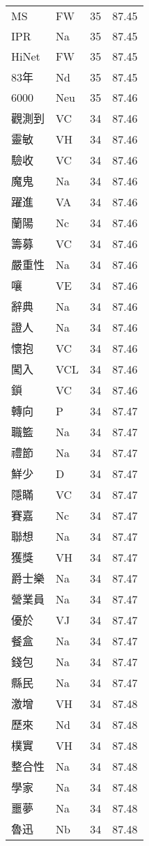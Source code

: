 \documentclass[twocolumn]{book}
\begin{document}
\begin{supertabular}{llrr}
MS & FW & 35 &  87.45\\
IPR & Na & 35 &  87.45\\
HiNet & FW & 35 &  87.45\\
83年 & Nd & 35 &  87.45\\
6000 & Neu & 35 &  87.46\\
觀測到 & VC & 34 &  87.46\\
靈敏 & VH & 34 &  87.46\\
驗收 & VC & 34 &  87.46\\
魔鬼 & Na & 34 &  87.46\\
躍進 & VA & 34 &  87.46\\
蘭陽 & Nc & 34 &  87.46\\
籌募 & VC & 34 &  87.46\\
嚴重性 & Na & 34 &  87.46\\
嚷 & VE & 34 &  87.46\\
辭典 & Na & 34 &  87.46\\
證人 & Na & 34 &  87.46\\
懷抱 & VC & 34 &  87.46\\
闖入 & VCL & 34 &  87.46\\
鎖 & VC & 34 &  87.46\\
轉向 & P & 34 &  87.47\\
職籃 & Na & 34 &  87.47\\
禮節 & Na & 34 &  87.47\\
鮮少 & D & 34 &  87.47\\
隱瞞 & VC & 34 &  87.47\\
賽嘉 & Nc & 34 &  87.47\\
聯想 & Na & 34 &  87.47\\
獲獎 & VH & 34 &  87.47\\
爵士樂 & Na & 34 &  87.47\\
營業員 & Na & 34 &  87.47\\
優於 & VJ & 34 &  87.47\\
餐盒 & Na & 34 &  87.47\\
錢包 & Na & 34 &  87.47\\
縣民 & Na & 34 &  87.47\\
激增 & VH & 34 &  87.48\\
歷來 & Nd & 34 &  87.48\\
樸實 & VH & 34 &  87.48\\
整合性 & Na & 34 &  87.48\\
學家 & Na & 34 &  87.48\\
噩夢 & Na & 34 &  87.48\\
魯迅 & Nb & 34 &  87.48\\

\end{supertabular}
\end{document}
